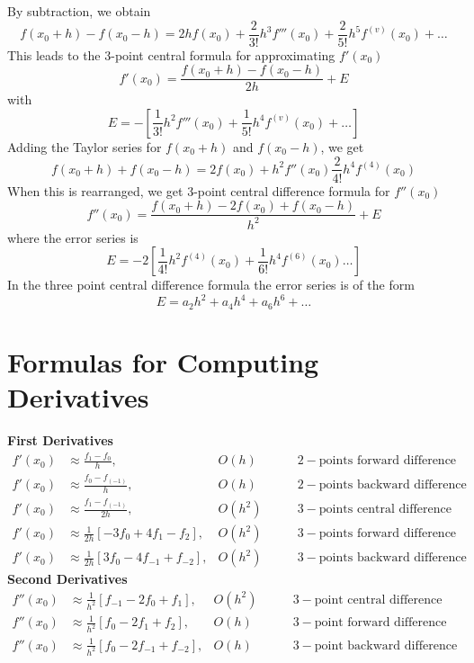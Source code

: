\documentclass[12pt,class=book,crop=false]{standalone}
\begin{document}
By subtraction, we obtain
\[
    f(x_0+h)-f(x_0-h)=2hf(x_0)+\frac{2}{3!} h^3 f'''(x_0)+\frac{2}{5!}h^5f^{(v)}(x_0)+\dots
\]
This leads to the 3-point central formula for approximating $ f' (x_0) $
\[
    f'(x_0)=\frac{f(x_0+h)-f(x_0-h)}{2h}+E
\]
with
\[
    E=-\left[ \frac{1}{3!}h^2 f'''(x_0)+\frac{1}{5!}h^4f^{(v)}(x_0)+\dots\right]
\]
Adding the Taylor series for $ f(x_0+h) $ and $ f(x_0-h) $, we get
\[
    f(x_0+h)+f(x_0-h)=2f(x_0)+h^2 f''(x_0)\frac{2}{4!}h^4f^{(4)}(x_0)
\]
When this is rearranged, we get 3-point central difference formula for $ f''(x_0) $
\[
    f''(x_0)=\frac{f(x_0+h)-2f(x_0)+f(x_0-h)}{h^2}+E
\]
where the error series is
\[
    E=-2\left[ \frac{1}{4!} h^2 f^{(4)} (x_0)+\frac{1}{6!} h^4 f^{(6)}(x_0)\dots\right]
\]
In the three point central difference formula the error series is of the form
\[
    E=a_2 h^2+a_4h^4+a_6h^6+\dots
\]
\section{Formulas for Computing Derivatives}
\textbf{First Derivatives}
\begin{align*}
    f' (x_0) & \approx \frac{f_1-f_0}{h},                   & O(h)\qquad   & 2-\text{points forward difference}  \\
    f' (x_0) & \approx \frac{f_0-f_(-1)}{h},                & O(h)\qquad   & 2-\text{points backward difference} \\
    f' (x_0) & \approx \frac{f_1-f_(-1)}{2h},               & O(h^2)\qquad & 3-\text{points central difference}  \\
    f' (x_0) & \approx \frac{1}{2h} [-3f_0+4f_1-f_2 ],      & O(h^2)\qquad & 3-\text{points forward difference}  \\
    f'(x_0)  & \approx \frac{1}{2h} [3f_0-4f_{-1}+f_{-2} ], & O(h^2)\qquad & 3-\text{points backward difference}
\end{align*}
\textbf{Second Derivatives}
\begin{align*}
    f''(x_0) & \approx \frac{1}{h^2}[f_{-1}-2f_0+f_1 ],    & O(h^2)\qquad & 3-\text{point central difference}  \\
    f''(x_0) & \approx\frac{1}{h^2} [f_0-2f_1+f_2 ],       & O(h)\qquad   & 3-\text{point forward difference}  \\
    f''(x_0) & \approx \frac{1}{h^2} [f_0-2f_{-1}+f_{-2}], & O(h)\qquad   & 3-\text{point backward difference}
\end{align*}
\end{document}
